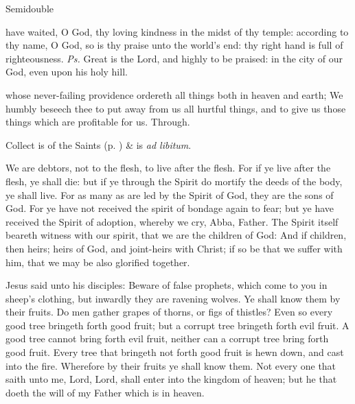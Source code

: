 \begin{inhead}
    {Semidouble}
\end{inhead}

\properantiphonfix

\introit
{} have waited, O God, thy loving kindness in the midst of thy temple: according to thy name, O God, so is thy praise unto the world's end: thy right hand is full of righteousness. \textit{Ps.} Great is the Lord, and highly to be praised: in the city of our God, even upon his holy hill.

\collect
{} whose never-failing providence ordereth all things both in heaven and earth; We humbly beseech thee to put away from us all hurtful things, and to give us those things which are profitable for us. Through.
\begin{rubric}
     Collect is of the Saints (p. \pageref{SPSaints}) \&  is \emph{ad libitum}.
\end{rubric}

 We are debtors, not to the flesh, to live after the flesh. For if ye live after the flesh, ye shall die: but if ye through the Spirit do mortify the deeds of the body, ye shall live. For as many as are led by the Spirit of God, they are the sons of God. For ye have not received the spirit of bondage again to fear; but ye have received the Spirit of adoption, whereby we cry, Abba, Father. The Spirit itself beareth witness with our spirit, that we are the children of God: And if children, then heirs; heirs of God, and joint-heirs with Christ; if so be that we suffer with him, that we may be also glorified together.



 Jesus said unto his disciples: Beware of false prophets, which come to you in sheep's clothing, but inwardly they are ravening wolves. Ye shall know them by their fruits. Do men gather grapes of thorns, or figs of thistles? Even so every good tree bringeth forth good fruit; but a corrupt tree bringeth forth evil fruit. A good tree cannot bring forth evil fruit, neither can a corrupt tree bring forth good fruit. Every tree that bringeth not forth good fruit is hewn down, and cast into the fire. Wherefore by their fruits ye shall know them. Not every one that saith unto me, Lord, Lord, shall enter into the kingdom of heaven; but he that doeth the will of my Father which is in heaven.

